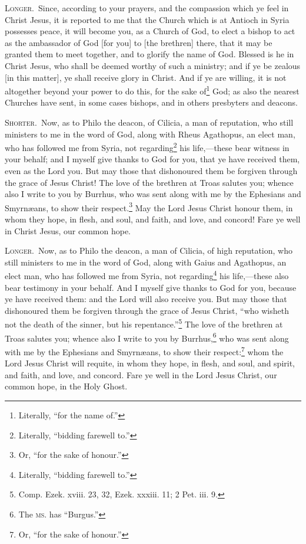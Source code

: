 \textsc{Longer.}~Since, according to your prayers, and the compassion which ye feel in Christ Jesus, it is reported to me that the Church which is at Antioch in Syria possesses peace, it will become you, as a Church of God, to elect a bishop to act as the ambassador of God [for you] to [the brethren] there, that it may be granted them to meet together, and to glorify the name of God. Blessed is he in Christ Jesus, who shall be deemed worthy of such a ministry; and if ye be zealous [in this matter], ye shall receive glory in Christ. And if ye are willing, it is not altogether beyond your power to do this, for the sake of\footnote{Literally, “for the name of.”} God; as also the nearest Churches have sent, in some cases bishops, and in others presbyters and deacons.


\textsc{Shorter.}~Now, as to Philo the deacon, of Cilicia, a man of reputation, who still ministers to me in the word of God, along with Rheus Agathopus, an elect man, who has followed me from Syria, not regarding\footnote{Literally, “bidding farewell to.”} his life,—these bear witness in your behalf; and I myself give thanks to God for you, that ye have received them, even as the Lord you. But may those that dishonoured them be forgiven through the grace of Jesus Christ! The love of the brethren at Troas salutes you; whence also I write to you by Burrhus, who was sent along with me by the Ephesians and Smyrnæans, to show their respect.\footnote{Or, “for the sake of honour.”} May the Lord Jesus Christ honour them, in whom they hope, in flesh, and soul, and faith, and love, and concord! Fare ye well in Christ Jesus, our common hope.

\textsc{Longer.}~Now, as to Philo the deacon, a man of Cilicia, of high reputation, who still ministers to me in the word of God, along with Gaius and Agathopus, an elect man, who has followed me from Syria, not regarding\footnote{Literally, “bidding farewell to.”} his life,—these also bear testimony in your behalf. And I myself give thanks to God for you, because ye have received them: and the Lord will also receive you. But may those that dishonoured them be forgiven through the grace of Jesus Christ, “who wisheth not the death of the sinner, but his repentance.”\footnote{Comp. Ezek. xviii. 23, 32, Ezek. xxxiii. 11; 2 Pet. iii. 9.} The love of the brethren at Troas salutes you; whence also I write to you by Burrhus,\footnote{The \textsc{ms.} has “Burgus.”} who was sent along with me by the Ephesians and Smyrnæans, to show their respect:\footnote{Or, “for the sake of honour.”} whom the Lord Jesus Christ will requite, in whom they hope, in flesh, and soul, and spirit, and faith, and love, and concord. Fare ye well in the Lord Jesus Christ, our common hope, in the Holy Ghost.

